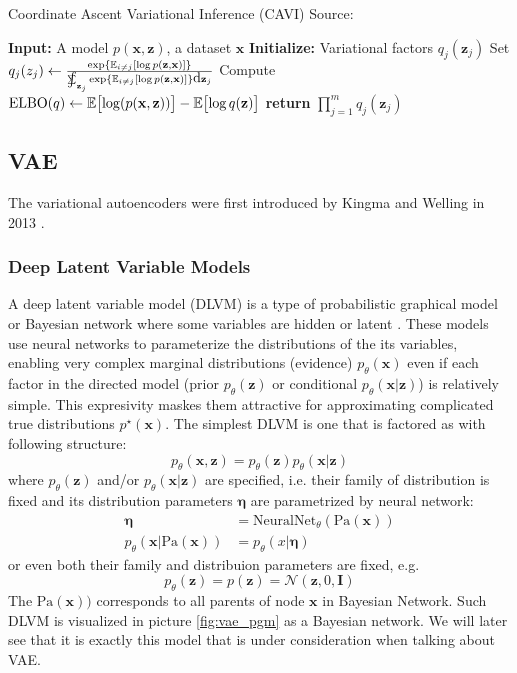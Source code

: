 \begin{algorithm}
    \caption[CAVI algorithm]{Coordinate Ascent Variational Inference (CAVI) Source: \cite{intro-variational-blog-2019}}
    \label{alg:cavi}
    \begin{algorithmic}[2]
      \State \textbf{Input:} A model $p(\mathbf{x},\mathbf{z})$, a dataset $\mathbf{x}$
      \State \textbf{Initialize:} Variational factors $q_j(\mathbf{z}_j)$
          \State Set $q_j(z_j) \gets \frac{\exp{\EX_{i \neq j} [\log p(\mathbf{z},\mathbf{x})]}}{\SumInt_{\mathbf{z}_j}\exp{\EX_{i \neq j} [\log p(\mathbf{z},\mathbf{x})]}\d \mathbf{z}_j}$
        \EndFor
        \State Compute $\mathrm{ELBO}(q) \gets \operatorname{\mathbb{E}} \bigl[\log(p(\mathbf{x},\mathbf{z}))\bigr] - \operatorname{\mathbb{E}} \bigl[ \log q(\mathbf{z}) \bigr]$
      \EndWhile
      \State \textbf{return} $\prod_{j=1}^m q_j(\mathbf{z}_j)$
    \end{algorithmic}
\end{algorithm}

\subsection{VAE}
\label{subsec:vaes}
The variational autoencoders were first introduced by Kingma and Welling in 2013 \cite{vae-original-2013}.

\subsubsection{Deep Latent Variable Models}
A deep latent variable model (DLVM) is a type of probabilistic graphical model or Bayesian network where some variables are hidden or latent \cite{intro-vae-2019}.
These models use neural networks to parameterize the distributions of the its variables, enabling very complex marginal distributions (evidence)
$p_\theta(\mathbf{x})$ even if each factor in the directed model (prior $p_\theta(\mathbf{z})$ or conditional $p_\theta(\mathbf{x}|\mathbf{z})$)
is relatively simple. This expresivity maskes them attractive for approximating complicated true distributions $p^\star(\mathbf{x})$. 
The simplest DLVM is one that is factored as with following structure:
$$
p_\theta(\mathbf{x},\mathbf{z}) = p_\theta(\mathbf{z})p_\theta(\mathbf{x}|\mathbf{z})
$$
where $p_\theta(\mathbf{z})$ and/or $p_\theta(\mathbf{x}|\mathbf{z})$ are specified, i.e. their family of distribution is fixed and its distribution
parameters $\mathbf{\eta}$ are parametrized by neural network:
\begin{align*}
\mathbf{\eta} &= \mathrm{NeuralNet}_\theta(\text{Pa}(\mathbf{x})) \\
p_\theta(\mathbf{x}|\text{Pa}(\mathbf{x})) &= p_\theta(x|\mathbf{\eta})
\end{align*}
or even both their family and distribuion parameters are fixed, e.g. 
$$
p_\theta(\mathbf{z}) = p(\mathbf{z}) = \mathcal{N}(\mathbf{z},0,\mathbf{I})
$$
The $\text{Pa}(\mathbf{x}))$ corresponds to all parents of node $\mathbf{x}$ in Bayesian Network.
Such DLVM is visualized in picture \ref{fig:vae_pgm} as a Bayesian network. We will later see that 
it is exactly this model that is under consideration when talking about VAE. 


